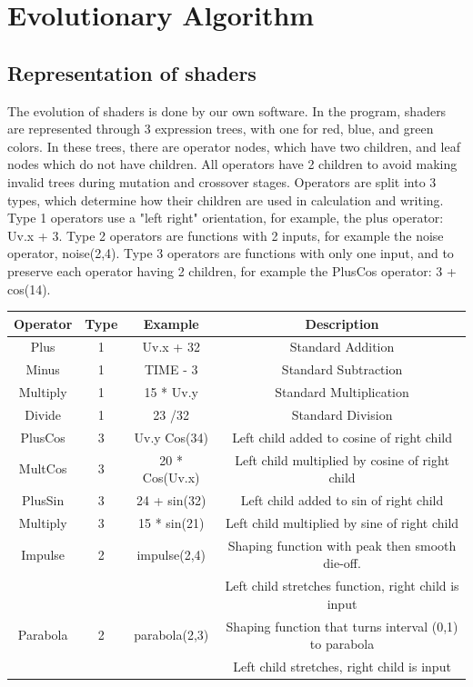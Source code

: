 \documentclass{acmart}
\begin{document}
\section*{Evolutionary Algorithm}
\subsection*{Representation of shaders}
The evolution of shaders is done by our own software. In the program, shaders are represented through 3 expression trees, with one for red, blue, and green colors. In these trees, there are 
operator nodes, which have two children, and leaf nodes which do not have children. All operators have 2 children to avoid making invalid trees during mutation and crossover stages. 
Operators are split into 3 types, which determine how their children are used in calculation and writing. Type 1 operators use a "left right" orientation, for example, the plus operator: Uv.x + 3. 
Type 2 operators are functions with 2 inputs, for example the noise operator, noise(2,4). Type 3 operators are functions with only one input, and to preserve each operator having 2 children, for example the PlusCos operator: 3 + cos(14).
\\
\begin{tabular}{|c|c|c|c|}
    \hline
    Operator & Type&  Example & Description\\
    \hline
    Plus & 1 & Uv.x + 32 & Standard Addition \\
    \hline
    Minus & 1 &TIME - 3 & Standard Subtraction \\
    \hline
    Multiply & 1 & 15 * Uv.y & Standard Multiplication  \\
    \hline
    Divide & 1 & 23 /32 & Standard Division  \\
    \hline
    PlusCos & 3 & Uv.y Cos(34) & Left child added to cosine of right child  \\
    \hline
    MultCos & 3 & 20 * Cos(Uv.x) & Left child multiplied by cosine of right child  \\
    \hline
    PlusSin & 3  & 24 + sin(32) & Left child added to sin of right child  \\
    \hline
    Multiply & 3 & 15 * sin(21)& Left child multiplied by sine of right child   \\
    \hline
    Impulse & 2 & impulse(2,4) & Shaping function with peak then smooth die-off. \\ & & & Left child stretches function, right child is input\\
    \hline
    Parabola & 2 & parabola(2,3) & Shaping function that turns interval (0,1) to parabola \\
    & & & Left child stretches, right child is input\\
    \hline
\end{tabular}\\\\
\end{document}
